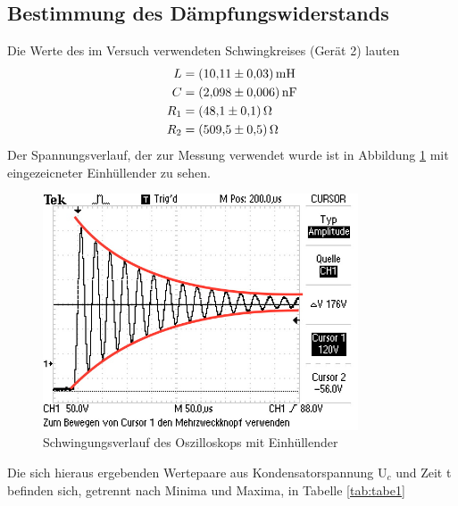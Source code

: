 \subsection{Bestimmung des Dämpfungswiderstands}
Die Werte des im Versuch verwendeten Schwingkreises (Gerät 2) lauten
\begin{align*}
  L &= \SI{10.11(3)}{\milli\henry} \\
  C &= \SI{2.098(6)}{\nano\farad} \\
  R_1 &= \SI{48.1 (1)}{\ohm} \\
  R_2 &= \SI{509.5(5)}{\ohm} \\
\end{align*}
\noindent Der Spannungsverlauf, der zur Messung verwendet wurde ist in Abbildung \ref{fig:fig1}
mit eingezeicneter Einhüllender zu sehen.
\begin{figure}[H]
  \centering
  \includegraphics[height=7cm]{Schwingung.JPG}
  \caption{Schwingungsverlauf des Oszilloskops mit Einhüllender}
  \label{fig:fig1}
\end{figure}

\noindent Die sich hieraus ergebenden Wertepaare aus Kondensatorspannung $\text{U}_c$
und Zeit t befinden sich, getrennt nach Minima und Maxima, in Tabelle \ref{tab:tabe1}



